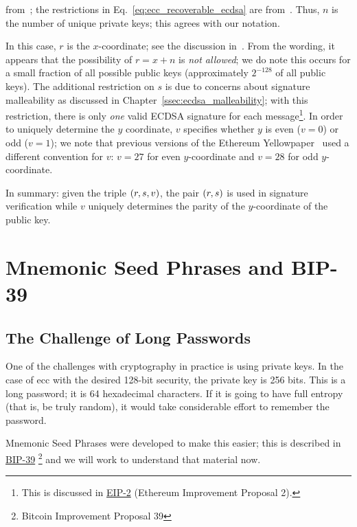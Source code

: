 \noindent
from~\cite[Eq.~313]{EthereumYellowpaper};
the restrictions in Eq.~\eqref{eq:ecc_recoverable_ecdsa}
are from~\cite[Eqs.~310--312]{EthereumYellowpaper}.
Thus, $n$ is the number of unique private keys;
this agrees with our notation.

In this case, $r$ is the $x$-coordinate;
see the discussion in~\cite[Appendix F]{EthereumYellowpaper}.
From the wording, it appears that the possibility
of $r = x + n$ is \emph{not allowed};
we do note this occurs for a small fraction of all possible
public keys (approximately $2^{-128}$ of all public keys).
The additional restriction on $s$ is due to concerns about signature
malleability as discussed in Chapter~\ref{ssec:ecdsa_malleability};
with this restriction, there is only \emph{one} valid ECDSA signature
for each
message\footnote{This is discussed in
\href{https://github.com/ethereum/EIPs/blob/master/EIPS/eip-2.md}{EIP-2}
(Ethereum Improvement Proposal 2).}.
In order to uniquely determine the $y$ coordinate, $v$ specifies
whether $y$ is even ($v=0$) or odd ($v=1$);
we note that previous versions of the
Ethereum Yellowpaper~\cite[Appendix F]{EthereumYellowpaperOct2019}
used a different convention for $v$: $v=27$ for even $y$-coordinate
and $v=28$ for odd $y$-coordinate.

In summary: given the triple $\left( r,s,v \right)$,
the pair $\left( r,s \right)$ is used in signature verification
while $v$ uniquely determines the parity of the $y$-coordinate
of the public key.



\section{Mnemonic Seed Phrases and BIP-39}
\label{sec:ecc_bip39}

\subsection{The Challenge of Long Passwords}

One of the challenges with cryptography in practice is using private keys.
In the case of \gls{ecc} with the desired 128-bit security,
the private key is 256 bits.
This is a long password; it is 64 hexadecimal characters.
If it is going to have full entropy (that is, be truly random),
it would take considerable effort to remember the password.

Mnemonic Seed Phrases were developed to make this easier;
this is described in
\href{https://github.com/bitcoin/bips/blob/master/bip-0039.mediawiki}{BIP-39}%
\footnote{Bitcoin Improvement Proposal 39}
and we will work to understand that material now.

